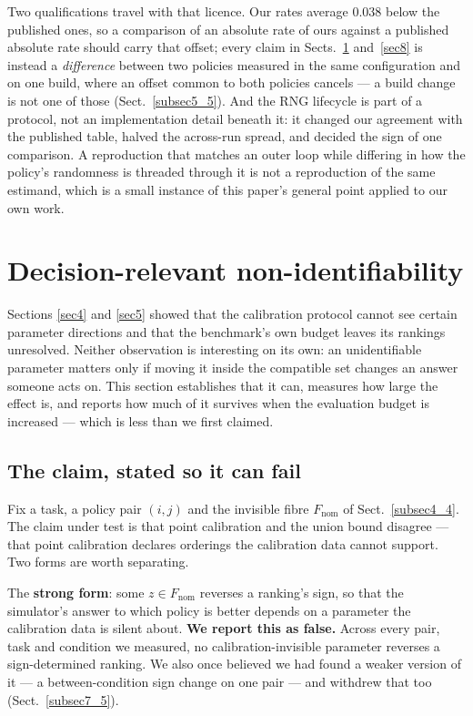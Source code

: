 \documentclass[pdflatex,iicol,sn-apa]{sn-jnl}
\theoremstyle{remark}
\begin{document}
Two qualifications travel with that licence. Our rates average $0.038$ below the published
ones, so a comparison of an absolute rate of ours against a published absolute rate should carry that
offset; every claim in Sects.~\ref{sec7} and~\ref{sec8} is instead a \emph{difference} between two
policies measured in the same configuration and on one build, where an offset common to both
policies cancels --- a build change is not one of those (Sect.~\ref{subsec5_5}). And the RNG lifecycle is
part of a protocol, not an implementation detail beneath it: it changed our agreement with the
published table, halved the across-run spread, and decided the sign of one comparison. A reproduction
that matches an outer loop while differing in how the policy's randomness is threaded through it is
not a reproduction of the same estimand, which is a small instance of this paper's general point
applied to our own work.

\section{Decision-relevant non-identifiability}\label{sec7}

Sections \ref{sec4} and \ref{sec5} showed that the calibration protocol cannot see certain parameter
directions and that the benchmark's own budget leaves its rankings unresolved. Neither observation is
interesting on its own: an unidentifiable parameter matters only if moving it inside the compatible
set changes an answer someone acts on. This section establishes that it can, measures how large the
effect is, and reports how much of it survives when the evaluation budget is increased --- which is
less than we first claimed.

\subsection{The claim, stated so it can fail}\label{subsec7_1}

Fix a task, a policy pair $(i,j)$ and the invisible fibre $F_{\mathrm{nom}}$ of Sect.~\ref{subsec4_4}. The
claim under test is that point calibration and the union bound disagree --- that point calibration
declares orderings the calibration data cannot support. Two forms are worth separating.

The \textbf{strong form}: some $z \in F_{\mathrm{nom}}$ reverses a ranking's sign, so that the simulator's
answer to which policy is better depends on a parameter the calibration data is silent about.
\textbf{We report this as false.} Across every pair, task and condition we measured, no
calibration-invisible parameter reverses a sign-determined ranking. We also once believed we had
found a weaker version of it --- a between-condition sign change on one pair --- and withdrew that
too (Sect.~\ref{subsec7_5}).
\end{document}

